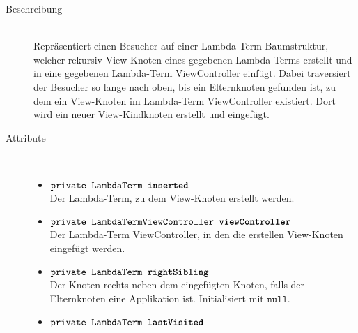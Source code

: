 \begin{description}
\item[Beschreibung] \hfill \\ Repräsentiert einen Besucher auf einer Lambda-Term Baumstruktur, welcher rekursiv View-Knoten eines gegebenen Lambda-Terms erstellt und in eine gegebenen Lambda-Term ViewController einfügt. Dabei traversiert der Besucher so lange nach oben, bis ein Elternknoten gefunden ist, zu dem ein View-Knoten im Lambda-Term ViewController existiert. Dort wird ein neuer View-Kindknoten erstellt und eingefügt.

\item[Attribute] \hfill \\
	\vspace{-.8cm}
	\begin{itemize}
		\item $\texttt{private LambdaTerm \textbf{inserted}}$ \\ Der Lambda-Term, zu dem View-Knoten erstellt werden.
		\item $\texttt{private LambdaTermViewController \textbf{viewController}}$ \\ Der Lambda-Term ViewController, in den die erstellen View-Knoten eingefügt werden.
		\item $\texttt{private LambdaTerm \textbf{rightSibling}}$ \\ Der Knoten rechts neben dem eingefügten Knoten, falls der Elternknoten eine Applikation ist. Initialisiert mit $\texttt{null.}$
		\item $\texttt{private LambdaTerm \textbf{lastVisited}}$ \\ 
	\end{itemize}


\end{description}

